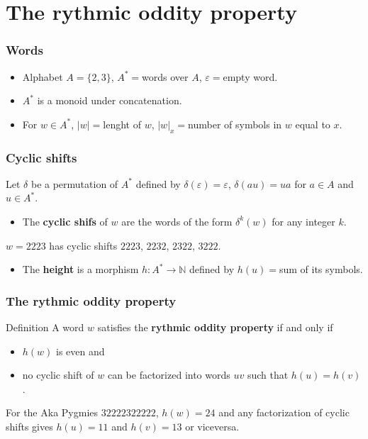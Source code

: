 \documentclass{beamer}
\theoremstyle{definition}
\begin{document}
\section{The rythmic oddity property}

\begin{frame}
\frametitle{Words}
\begin{itemize}
\item<1-> Alphabet $A=\{2,3\}$, $A^*=$words over $A$, $\varepsilon=$empty word. 
\item<2-> $A^*$ is a monoid under concatenation.
\item<3-> For $w\in A^*$, $|w|=$lenght of $w$, $|w|_x=$number of symbols in $w$ equal to $x$.
\end{itemize}
\end{frame}

\begin{frame}
\frametitle{Cyclic shifts}
Let $\delta$ be a permutation of $A^*$ defined by $\delta(\varepsilon)=\varepsilon$, $\delta(au)=ua$ for $a\in A$ and $u\in A^*$.

\begin{itemize}
\item<1-> The \textbf{cyclic shifs} of $w$ are the words of the form $\delta^k(w)$ for any integer $k$.
\end{itemize} \pause

\begin{example}
$w=2223$ has cyclic shifts $2223$, $2232$, $2322$, $3222$.  
\end{example}\pause

\begin{itemize}
\item<3-> The \textbf{height} is a morphism $h:A^*\to\mathbb{N}$ defined by $h(u)=$sum of its symbols.
\end{itemize} 
\end{frame}

\begin{frame}
\frametitle{The rythmic oddity property}
\begin{alertblock}{Definition}
A word $w$ satisfies the \textbf{rythmic oddity property} if and only if
\begin{itemize}
\item $h(w)$ is even and
\item no cyclic shift of $w$ can be factorized into words $uv$ such that $h(u)=h(v)$. 
\end{itemize}
\end{alertblock}\pause 

\begin{example}
For the Aka Pygmies $32222322222$, $h(w)=24$ and any factorization of cyclic shifts gives $h(u)=11$ and $h(v)=13$ or viceversa. 
\end{example}
\end{frame}
\end{document}

